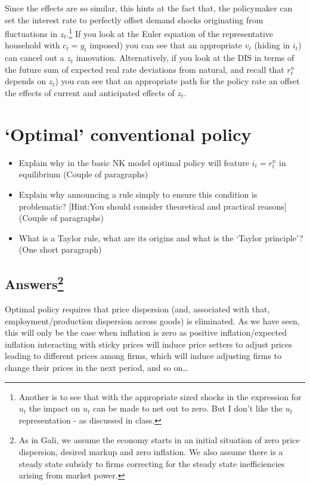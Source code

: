 \documentclass[authoryear,11pt]{elsarticle}
\begin{document}
Since the effects are so similar, this hints at the fact that, the policymaker can set the interest rate to perfectly offset demand shocks originating from fluctuations in $z_{t}$.\footnote{Another is to see that with the appropriate sized shocks in the expression for $u_{t}$ the impact on $u_{t}$ can be made to net out to zero. But I don't like the $u_{t}$ representation - as discussed in class.} If you look at the Euler equation of the representative household with $c_{t}=y_{t}$ imposed) you can see that an appropriate $v_{t}$ (hiding in $i_{t}$) can cancel out a $z_{t}$ innovation. Alternatively, if you look at the DIS in terms of the future sum of expected real rate deviations from natural, and recall that $r^{n}_{t}$ depends on $z_{t}$) you can see that an appropriate path for the policy rate an offset the effects of current and anticipated effects of $z_{t}$.

\section{`Optimal' conventional policy}
\begin{itemize}
\item	Explain why in the basic NK model optimal policy will feature $i_{t} = r_{t}^{n}$ in equilibrium (Couple of paragraphs)
\item	Explain why announcing a rule simply to ensure this condition is problematic? [Hint:You should consider theoretical and practical reasons] (Couple of paragraphs)
\item	What is a Taylor rule, what are its origins and what is the `Taylor principle'? (One short paragraph)
\end{itemize}

\subsection*{Answers\footnote{As in Gali, we assume the economy starts in an initial situation of zero price dispersion, desired markup and zero inflation. We also assume there is a steady state subsidy to firms correcting for the steady state inefficiencies arising from market power.}}
Optimal policy requires that price dispersion (and, associated with that, employment/production dispersion across goods) is eliminated. As we have seen, this will only be the case when inflation is zero as positive inflation/expected inflation interacting with sticky prices will induce price setters to adjust prices leading to different prices among firms, which will induce adjusting firms to change their prices in the next period, and so on\ldots
\end{document}
